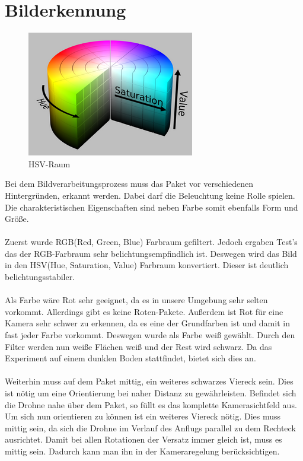 \chapter{Bilderkennung}
\begin{figure}[h]
	\centering
	\includegraphics[scale=0.5]{"Grafiken/hsv_colorspace_zoom34.png"}
	\caption{HSV-Raum}
	\label{fig:meine-grafik}
\end{figure}
Bei dem Bildverarbeitungsprozess muss das Paket vor verschiedenen Hintergründen, erkannt werden. Dabei darf die Beleuchtung keine Rolle spielen. Die charakteristischen Eigenschaften sind neben Farbe somit ebenfalls Form und Größe.\\
\\
Zuerst wurde RGB(Red, Green, Blue) Farbraum gefiltert. Jedoch ergaben Test's das der RGB-Farbraum sehr belichtungsempfindlich ist. Deswegen wird das Bild in den HSV(Hue, Saturation, Value) Farbraum konvertiert. Dieser ist deutlich belichtungsstabiler.\\
\\
Als Farbe wäre Rot sehr geeignet, da es in unsere Umgebung sehr selten vorkommt. Allerdings gibt es keine Roten-Pakete. Außerdem ist Rot für eine Kamera sehr schwer zu erkennen, da es eine der Grundfarben ist und damit in fast jeder Farbe vorkommt. Deswegen wurde als Farbe weiß gewählt. Durch den Filter werden nun weiße Flächen weiß und der Rest wird schwarz. Da das Experiment auf einem dunklen Boden stattfindet, bietet sich dies an.\\
\\
Weiterhin muss auf dem Paket mittig, ein weiteres schwarzes Viereck sein. Dies ist nötig um eine Orientierung bei naher Distanz zu gewährleisten. Befindet sich die Drohne nahe über dem Paket, so füllt es das komplette Kamerasichtfeld aus. Um sich nun orientieren zu können ist ein weiteres Viereck nötig. Dies muss mittig sein, da sich die Drohne im Verlauf des Anflugs parallel zu dem Rechteck ausrichtet. Damit bei allen Rotationen der Versatz immer gleich ist, muss es mittig sein. Dadurch kann man ihn in der Kameraregelung berücksichtigen.\\
